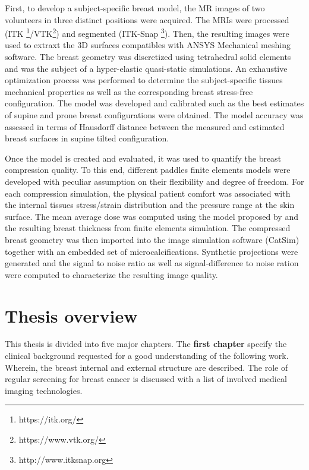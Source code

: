 First, to develop a subject-specific breast model, the MR images of two volunteers in three distinct positions were acquired. The MRIs were processed (ITK \footnote{https://itk.org/}/VTK\footnote{https://www.vtk.org/}) and segmented (ITK-Snap \footnote{http://www.itksnap.org}). Then, the resulting images were used to extraxt the 3D surfaces compatibles with ANSYS Mechanical meshing software. The breast geometry was discretized using tetrahedral solid elements and was the subject of a hyper-elastic quasi-static simulations. An exhaustive optimization process was performed to determine the subject-specific tissues mechanical properties as well as the corresponding breast stress-free configuration. The model was developed and calibrated such as the best estimates of supine and prone breast configurations were obtained. The model accuracy was assessed in terms of Hausdorff distance between the measured and estimated breast surfaces in supine tilted configuration.

Once the model is created and evaluated, it was used to quantify the breast compression quality. To this end, different paddles finite elements models were developed with peculiar assumption on their flexibility and degree of freedom. For each compression simulation, the physical patient comfort was associated with the internal tissues stress/strain distribution and the pressure range at the skin surface. The mean average dose was computed using the model proposed by \cite{dance_additional_2000} and the resulting breast thickness from finite elements simulation. The compressed breast geometry was then imported into the image simulation software (CatSim) together with an embedded set of microcalcifications. Synthetic projections were generated and the signal to noise ratio as well as signal-difference to noise ration were computed to characterize the resulting image quality.   

\cleardoublepage
\chapter*{Thesis overview}\label{section:thesisoverview}

This thesis is divided into five major chapters. The \textbf{first chapter} specify the clinical background  requested for a good understanding of the following work. Wherein, the breast internal and external structure are described. The role of regular screening for breast cancer is discussed with a list of involved medical imaging technologies. 

